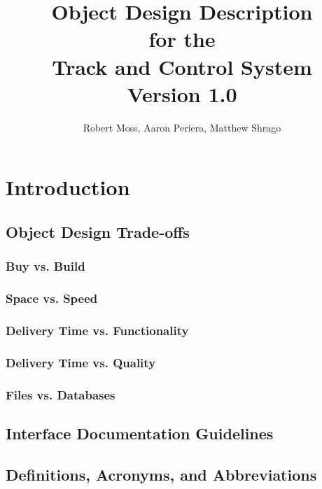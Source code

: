 \documentclass[titlepage]{article}
\begin{document}
\title{
\textbf{
Object Design Description}
\protect\\
for the
\protect\\
\textbf{
Track and Control System}
\protect\\
{\small Version 1.0}}

\author{Robert Moss, Aaron Periera, Matthew Shrago}
\maketitle

\newpage
\tableofcontents{} 
\newpage

\section{Introduction}

\subsection{Object Design Trade-offs}

\subsubsection{Buy vs. Build}

\subsubsection{Space vs. Speed}

\subsubsection{Delivery Time vs. Functionality}

\subsubsection{Delivery Time vs. Quality}

\subsubsection{Files vs. Databases}

\subsection{Interface Documentation Guidelines}

\subsection{Definitions, Acronyms, and Abbreviations}
\end{document}
